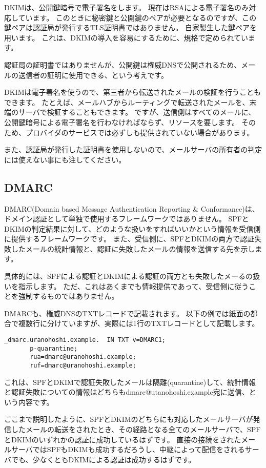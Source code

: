 DKIMは、公開鍵暗号で電子署名をします。
現在はRSAによる電子署名のみ対応しています。
このときに秘密鍵と公開鍵のペアが必要となるのですが、この鍵ペアは認証局が発行するTLS証明書ではありません。
自家製生した鍵ペアを用います。
これは、DKIMの導入を容易にするために、規格で定められています。

認証局の証明書ではありませんが、公開鍵は権威DNSで公開されるため、メールの送信者の証明に使用できる、という考えです。

DKIMは電子署名を使うので、第三者から転送されたメールの検証を行うこともできます。
たとえば、メールハブからルーティングで転送されたメールを、末端のサーバで検証することもできます。
ですが、送信側はすべてのメールに、公開鍵暗号による電子署名を行わなければならず、リソースを要します。
そのため、プロバイダのサービスでは必ずしも提供されていない場合があります。

また、認証局が発行した証明書を使用しないので、メールサーバの所有者の判定には使えない事にも注してください。

\subsection{DMARC}
DMARC(Domain based Message Authentication Reporting & Conformance)は、ドメイン認証として単独で使用するフレームワークではありません。 SPFとDKIMの判定結果に対して、どのような扱いをすればいいかという情報を受信側に提供するフレームワークです。
また、受信側に、SPFとDKIMの両方で認証失敗したメールの統計情報と、認証に失敗したメールの情報を送信する先を示します。

具体的には、SPFによる認証とDKIMによる認証の両方とも失敗したメーるの扱いを指示します。
ただ、これはあくまでも情報提供であって、受信側に従うことを強制するものではありません。

DMARCも、権威DNSのTXTレコードで記載されます。
以下の例では紙面の都合で複数行に分けていますが、実際には1行のTXTレコードとして記載します。

\begin{verbatim}
_dmarc.uranohoshi.example.  IN TXT v=DMARC1;
       p-quarantine;
       rua=dmarc@uranohoshi.example;
       ruf=dmarc@uranohoshi.example;
\end{verbatim}

これは、SPFとDKIMで認証失敗したメールは隔離(quarantine)して、統計情報と認証失敗についての情報はどちらもdmarc@utanohoshi.example宛に送信、という内容です。

ここまで説明したように、SPFとDKIMのどちらにも対応したメールサーバが発信したメールの転送をされたとき、その経路となる全てのメールサーバで、SPFとDKIMのいずれかの認証に成功しているはずです。
直接の接続をされたメールサーバではSPFもDKIMも成功するだろうし、中継によって配信をされるサーバでも、少なくともDKIMによる認証は成功するはずです。

